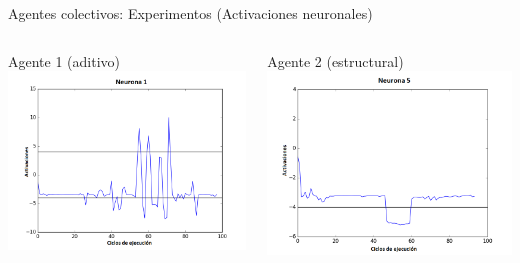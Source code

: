 \documentclass[aspectratio=169]{beamer}
\begin{document}
\begin{frame}{Agentes colectivos: Experimentos (Activaciones neuronales)}
  \begin{columns}
    \begin{column}{0.47\textwidth}
      \begin{block}{Agente 1 (aditivo)}
        \vspace{0.5cm}
      \includegraphics[width=1.0\textwidth,height=.6\textheight]{Imagenes/Neurona0}
    \end{block}
    \end{column}
    \begin{column}{0.5\textwidth}
      \begin{block}{Agente 2 (estructural)}
        \vspace{0.5cm}
      \includegraphics[width=1.0\textwidth,height=.6\textheight]{Imagenes/Neurona4}
      \end{block}
    \end{column}
  \end{columns}
\end{frame}
\end{document}
